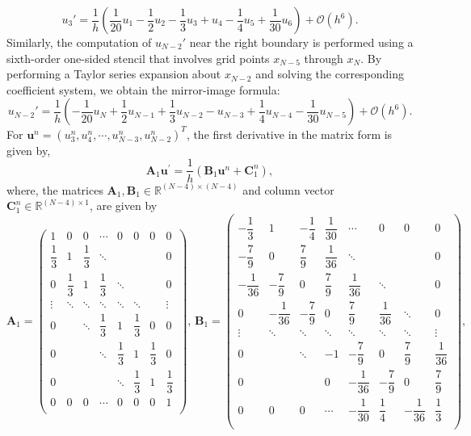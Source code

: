 \documentclass[11pt,a4paper]{amsart}
\theoremstyle{plain}
\theoremstyle{definition}
\theoremstyle{remark}
\numberwithin{equation}{section}
\begin{document}
\[
u_3' = \frac{1}{h} \left( \frac{1}{20}u_1 - \frac{1}{2}u_2 - \frac{1}{3}u_3 + u_4 - \frac{1}{4}u_5 + \frac{1}{30}u_6 \right) + \mathcal{O}(h^6).
\]
Similarly, the computation of \( u_{N-2}' \) near the right boundary is performed using a sixth-order one-sided stencil that involves grid points \( x_{N-5} \) through \( x_N \). By performing a Taylor series expansion about \( x_{N-2} \) and solving the corresponding coefficient system, we obtain the mirror-image formula:
\[
u_{N-2}' = \frac{1}{h} \left( -\frac{1}{20}u_N + \frac{1}{2}u_{N-1} + \frac{1}{3}u_{N-2} - u_{N-3} + \frac{1}{4}u_{N-4} - \frac{1}{30}u_{N-5} \right) + \mathcal{O}(h^6).
\]
For $\mathbf{u}^{n} = (u_{3}^n, u_{4}^n, \cdots, u_{N-3}^n, u_{N-2}^n)^T$, the first derivative in the matrix form is given by,
\begin{equation}
    \mathbf{A}_1 \mathbf{u^{\prime}} = \dfrac{1}{h} (\mathbf{B}_1 \mathbf{u}^n + \mathbf{C}_1^n),   
\end{equation} 
where, the matrices $\mathbf{A}_1, \mathbf{B}_1 \in \mathbb{R}^{(N-4) \times (N-4)}$ and column vector $\mathbf{C}_1^n \in \mathbb{R}^{(N-4) \times 1}$, are given by 
\begin{equation} 
\mathbf{A}_1 = 
\begin{pmatrix}
1 & 0 & 0 & \cdots & 0 & 0 & 0 & 0 \\[0.3cm]
\dfrac{1}{3} & 1 & \dfrac{1}{3} & \ddots & & & & 0 \\[0.3cm]
0 & \dfrac{1}{3} & 1 & \dfrac{1}{3} & \ddots & & & 0 \\[0.3cm]
\vdots & \ddots & \ddots & \ddots & \ddots & \ddots & & \vdots \\[0.3cm]
0 & & \ddots & \dfrac{1}{3} & 1 & \dfrac{1}{3} & 0 & 0 \\[0.3cm]
0 & & & \ddots & \dfrac{1}{3} & 1 & \dfrac{1}{3} & 0 \\[0.3cm]
0 & & & & \ddots & \dfrac{1}{3} & 1 & \dfrac{1}{3} \\[0.3cm]
0 & 0 & 0 & \cdots & 0 & 0 & 0 & 1 \\
\end{pmatrix}
, \,
\mathbf{B}_1 = 
\begin{pmatrix}
-\dfrac{1}{3} & 1 & -\dfrac{1}{4} & \dfrac{1}{30} & \cdots & 0 & 0 & 0 \\[0.3cm]
-\dfrac{7}{9} & 0 & \dfrac{7}{9} & \dfrac{1}{36} & \ddots & & & 0 \\[0.3cm]
-\dfrac{1}{36} & -\dfrac{7}{9} & 0 & \dfrac{7}{9} & \dfrac{1}{36} & \ddots & & 0 \\[0.3cm]
0 & -\dfrac{1}{36} & -\dfrac{7}{9} & 0 & \dfrac{7}{9} & \dfrac{1}{36} & \ddots & 0 \\[0.3cm]
\vdots & \ddots & \ddots & \ddots & \ddots & \ddots & \ddots & \vdots \\[0.3cm]
0 & & \ddots & -1 & -\dfrac{7}{9} & 0 & \dfrac{7}{9} & \dfrac{1}{36} \\[0.3cm]
0 & & & 0 & -\dfrac{1}{36} & -\dfrac{7}{9} & 0 & \dfrac{7}{9} \\[0.3cm]
0 & 0 & 0 & \cdots & -\dfrac{1}{30} & \dfrac{1}{4} & -\dfrac{1}{36} & \dfrac{1}{3} \\
\end{pmatrix},
\end{equation}
\end{document}
